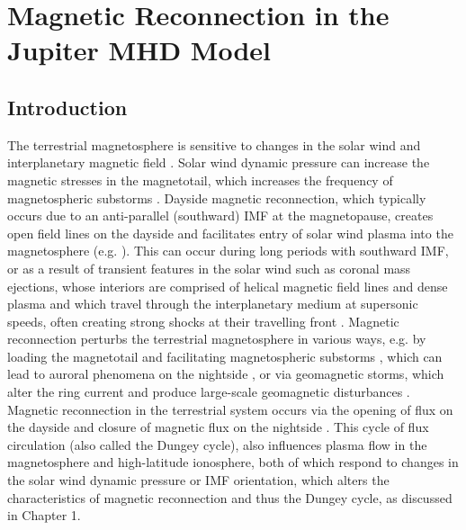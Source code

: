 \chapter{Magnetic Reconnection in the Jupiter MHD Model}


\section{Introduction}
The terrestrial magnetosphere is sensitive to changes in the solar wind and interplanetary magnetic field \cite{Sibeck1991SolarMotion,McPherron2008ResponseWind}. Solar wind dynamic pressure can increase the magnetic stresses in the magnetotail, which increases the frequency of magnetospheric substorms \cite{Kokubun1977TriggeringDiscontinuities,Newell2011SolarTriggering,Newell2016SubstormSpeed}. Dayside magnetic reconnection, which typically occurs due to an anti-parallel (southward) IMF at the magnetopause, creates open field lines on the dayside and facilitates entry of solar wind plasma into the magnetosphere (e.g. ). This can occur during long periods with southward IMF, or as a result of transient features in the solar wind such as coronal mass ejections, whose interiors are comprised of helical magnetic field lines and dense plasma and which travel through the interplanetary medium at supersonic speeds, often creating strong shocks at their travelling front \cite{Webb2012CoronalObservations}. Magnetic reconnection perturbs the terrestrial magnetosphere in various ways, e.g. by loading the magnetotail and facilitating magnetospheric substorms \cite{Morley2007OnOnsets}, which can lead to auroral phenomena on the nightside \cite{Elphinstone1996WhatSubstorm}, or via geomagnetic storms, which alter the ring current and produce large-scale geomagnetic disturbances \cite{Gonzalez1994WhatStorm}. Magnetic reconnection in the terrestrial system occurs via the opening of flux on the dayside and closure of magnetic flux on the nightside \cite{Dungey1961b}. This cycle of flux circulation (also called the Dungey cycle), also influences plasma flow in the magnetosphere and high-latitude ionosphere, both of which respond to changes in the solar wind dynamic pressure or IMF orientation, which alters the characteristics of magnetic reconnection and thus the Dungey cycle, as discussed in Chapter 1. 

